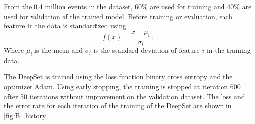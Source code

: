 From the $0.4$ million events in the dataset, $60\%$ are used for training and $40\%$ are used for validation of the trained model.
Before training or evaluation, each feature in the data is standardized using 
\begin{equation*}
    f(x) = \frac{x - \mu_i}{\sigma_i} \, .
\end{equation*} 
Where $\mu_i$ is the mean and $\sigma_i$ is the standard deviation of feature $i$ in the training data.

The DeepSet is trained using the loss function binary cross entropy and the optimizer Adam.
Using early stopping, the training is stopped at iteration 600 after 50 iterations without improvement on the validation dataset.
The loss and the error rate for each iteration of the training of the DeepSet are shown in \autoref{fig:B_history}.

